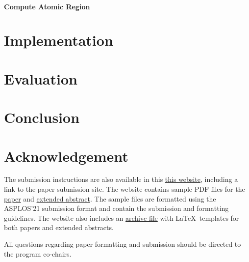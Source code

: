 \documentclass[pageno]{jpaper}
\begin{document}
\paragraph{Compute Atomic Region}


\section{Implementation}

\subsection{}


\section{Evaluation}


\section{Conclusion}


\section{Acknowledgement}



The submission instructions are also available in this
\href{https://asplos-conference.org/submissions/}{this website},
including a link to the paper submission site. The website contains
sample PDF files for the
\href{https://asplos-conference.org/wp-content/uploads/2020/06/asplos21-paper-template.pdf}{paper} and
\href{https://asplos-conference.org/wp-content/uploads/2020/06/asplos21-extended-abstract-template.pdf}{extended abstract}. The
sample files are formatted using the ASPLOS'21 submission format and
contain the submission and formatting guidelines. The website also
includes an \href{https://asplos-conference.org/wp-content/uploads/2020/06/asplos21-templates.zip}{archive file}
with \LaTeX~templates for both papers and extended abstracts.

All questions regarding paper formatting and submission should be directed
to the program co-chairs.
\end{document}

